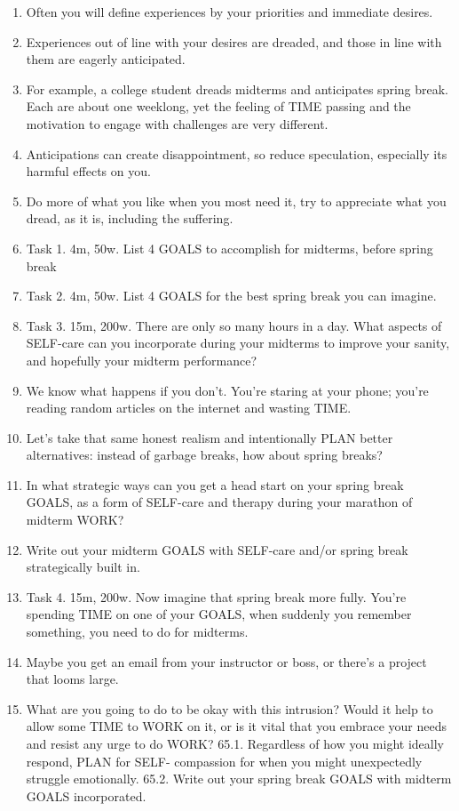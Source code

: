 \documentclass[
]{book}
\providecommand{\tightlist}{%
  \setlength{\itemsep}{0pt}\setlength{\parskip}{0pt}}
\begin{document}
\begin{enumerate}
\def\labelenumi{\arabic{enumi}.}
\setcounter{enumi}{50}
\tightlist
\item
  Often you will define experiences by your priorities and immediate
  desires.
\item
  Experiences out of line with your desires are dreaded, and those in
  line with them are eagerly anticipated.
\item
  For example, a college student dreads midterms and anticipates spring
  break. Each are about one weeklong, yet the feeling of TIME passing
  and the motivation to engage with challenges are very different.
\item
  Anticipations can create disappointment, so reduce speculation,
  especially its harmful effects on you.
\item
  Do more of what you like when you most need it, try to appreciate
  what you dread, as it is, including the suffering.
\item
  Task 1. 4m, 50w. List 4 GOALS to accomplish for midterms, before
  spring break
\item
  Task 2. 4m, 50w. List 4 GOALS for the best spring break you can
  imagine.
\item
  Task 3. 15m, 200w. There are only so many hours in a day. What
  aspects of SELF-care can you incorporate during your midterms to
  improve your sanity, and hopefully your midterm performance?
\item
  We know what happens if you don't. You're staring at your phone;
  you're reading random articles on the internet and wasting TIME.
\item
  Let's take that same honest realism and intentionally PLAN better
  alternatives: instead of garbage breaks, how about spring breaks?
\item
  In what strategic ways can you get a head start on your spring break
  GOALS, as a form of SELF-care and therapy during your marathon of
  midterm WORK?
\item
  Write out your midterm GOALS with SELF-care and/or spring break
  strategically built in.
\item
  Task 4. 15m, 200w. Now imagine that spring break more fully. You're
  spending TIME on one of your GOALS, when suddenly you remember
  something, you need to do for midterms.
\item
  Maybe you get an email from your instructor or boss, or there's a
  project that looms large.
\item
  What are you going to do to be okay with this intrusion? Would it help
  to allow some TIME to WORK on it, or is it vital that you embrace your
  needs and resist any urge to do WORK?
  65.1. Regardless of how you might ideally respond, PLAN for SELF-
  compassion for when you might unexpectedly struggle
  emotionally.
  65.2. Write out your spring break GOALS with midterm GOALS
  incorporated.
\end{enumerate}
\end{document}
